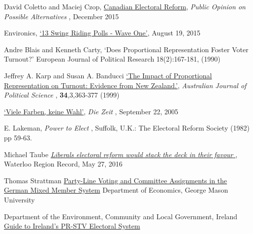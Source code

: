
\begin{thebibliography}{99} %

David Coletto and Maciej Czop,
{\color{blue} \href{https://d3n8a8pro7vhmx.cloudfront.net/broadbent/pages/4770/attachments/original/1448994262/Canadian_Electoral_Reform_-_Report.pdf?1448994262}{Canadian Electoral Reform}},
{\emph{Public Opinion on Possible Alternatives} }, December 2015

Environics,
{\color{blue} \href{http://www.votetogether.ca/pages/localpolling/}{`13 Swing Riding Polls - Wave One'}}, August 19, 2015

Andre Blais and Kenneth Carty, 
`Does Proportional Representation Foster Voter Turnout?'
European Journal of Political Research 18(2):167-181, (1990)

Jeffrey A. Karp and Susan A. Banducci
{\color{blue} \href{http://www.jkarp.com/pdf/ajps_1999.pdf}{`The Impact of Proportional Representation on Turnout: Evidence from New Zealand.'}},
{ \emph{Australian Journal of Political Science} }, \textbf{34},3,363-377 (1999)

  
{\color{blue} \href{http://www.zeit.de/2005/39/Wahl\_paradox}{`Viele Farben, keine Wahl'}},
 { \emph{Die Zeit} }, September 22, 2005

E. Lakeman,
{ \emph{Power to Elect} }, Suffolk, U.K.: The Electoral Reform Society (1982) pp 59-63.

 Michael Taube
{\color{blue} \href{http://www.therecord.com/opinion-story/6692466-liberals-electoral-reform-would-stack-the-deck-in-their-favour/}{ \emph{Liberals electoral reform would stack the deck in their favour} } },
Waterloo Region Record, May 27, 2016 

Thomas Strattman
{\color{blue} \href{https://www.researchgate.net/profile/Thomas_Stratmann2/publication/228978716_Party-Line_Voting_and_Committee_Assignments_in_the_German_Mixed_Member_System/links/0c96052d411ad2b0ae000000/Party-Line-Voting-and-Committee-Assignments-in-the-German-Mixed-Member-System.pdf}{Party-Line Voting and Committee Assignments in the German Mixed Member System}}
Department of Economics, George Mason University

Department of the Environment, Community and Local Government, Ireland
{\color{blue} \href{https://www.laois.ie/wp-content/uploads/Guide-to-Irelands-Electoral-System-2.pdf}{Guide to Ireland’s PR-STV Electoral System}}
 
\end{thebibliography}
